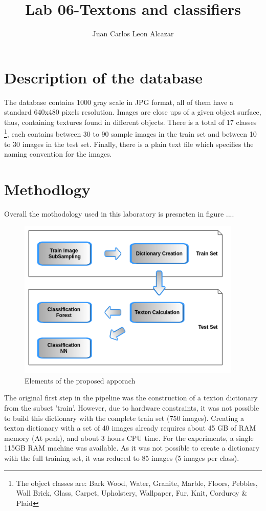 \documentclass[a4paper]{article}
\title{Lab 06-Textons and classifiers}
\author{Juan Carlos Leon Alcazar}
\begin{document}
\maketitle

\section{Description of the database}

The database\cite{Lazebnik2005} contains 1000 gray scale in JPG format, all of them have a standard 640x480 pixels resolution. Images are close ups of a given object surface, thus, containing textures found in different objects. There is a total of 17 classes \footnote{The object classes are: Bark Wood, Water, Granite, Marble, Floors, Pebbles, Wall Brick, Glass, Carpet, Upholstery, Wallpaper, Fur, Knit, Corduroy \& Plaid }, each contains between 30 to 90 sample images in the train set and between 10 to 30 images in the test set. Finally, there is a plain text file which specifies the naming convention for the images.


\section{Methodlogy}

Overall the mothodology used in this laboratory is presneten in figure ....

\begin{figure}[!ht]
	\centering
    \includegraphics[width=0.95\textwidth]{img/Pipeline.png}
  	\caption{Elements of the proposed apporach}
\end{figure}

The original first step in the pipeline was the construction of a texton dictionary from the subset 'train'.  However, due to hardware constraints, it was not possible to build this dictionary with the complete train set (750 images). Creating a texton dictionary with a set of 40 images already requires about 45 GB of RAM memory (At peak), and about 3 hours CPU time. For the experiments, a single 115GB RAM machine was available. As it was not possible to create a dictionary with the full training set, it was reduced to 85 images (5 images per class).
\end{document}
